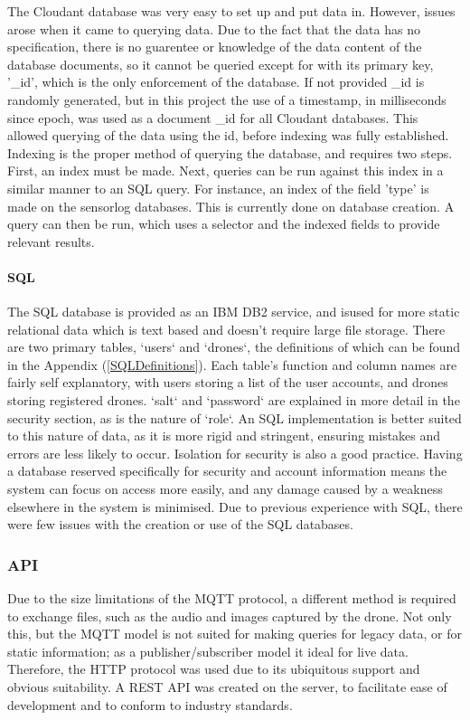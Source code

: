 \documentclass{article}
\begin{document}
The Cloudant database was very easy to set up and put data in. However, issues arose when it came to querying data. Due to the fact that the data has no specification, there is no guarentee or knowledge of the data content of the database documents, so it cannot be queried except for with its primary key, '\_id', which is the only enforcement of the database. If not provided \_id is randomly generated, but in this project the use of a timestamp, in milliseconds since epoch, was used as a document \_id for all Cloudant databases. This allowed querying of the data using the id, before indexing was fully established. Indexing is the proper method of querying the database, and requires two steps. First, an index must be made. Next, queries can be run against this index in a similar manner to an SQL query. For instance, an index of the field 'type' is made on the sensorlog databases. This is currently done on database creation. A query can then be run, which uses a selector and the indexed fields to provide relevant results.

\paragraph{SQL} \label{SQL}
The SQL database is provided as an IBM DB2 service, and isused for more static relational data which is text based and doesn't require large file storage. There are two primary tables, `users` and `drones`, the definitions of which can be found in the Appendix (\ref{SQLDefinitions}). Each table's function and column names are fairly self explanatory, with users storing a list of the user accounts, and drones storing registered drones. `salt` and `password` are explained in more detail in the security section, as is the nature of `role`. An SQL implementation is better suited to this nature of data, as it is more rigid and stringent, ensuring mistakes and errors are less likely to occur. Isolation for security is also a good practice. Having a database reserved specifically for security and account information means the system can focus on access more easily, and any damage caused by a weakness elsewhere in the system is minimised. Due to previous experience with SQL, there were few issues with the creation or use of the SQL databases. 

\subsubsection{API} \label{API}
Due to the size limitations of the MQTT protocol, a different method is required to exchange files, such as the audio and images captured by the drone. Not only this, but the MQTT model is not suited for making queries for legacy data, or for static information; as a publisher/subscriber model it ideal for live data. Therefore, the HTTP protocol was used due to its ubiquitous support and obvious suitability. A REST API was created on the server, to facilitate ease of development and to conform to industry standards. 
\end{document}
